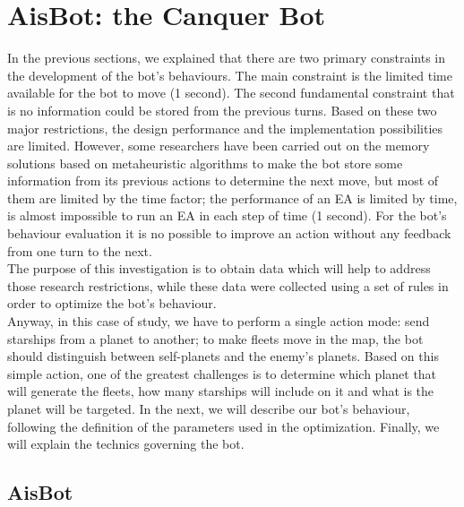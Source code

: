 \documentclass[conference]{IEEEtran}
\begin{document}
\section{AisBot: the Canquer Bot}
In the previous sections, we explained that there are two primary constraints in the development of the bot's behaviours. The main constraint is the limited time available for the bot to move (1 second). The second fundamental constraint that is no information could be stored from the previous turns. Based on these two major restrictions, the design performance and the implementation possibilities are limited. However, some researchers have been carried out on the memory solutions based on metaheuristic algorithms to make the bot store some information from its previous actions to determine the next move, but most of them are limited by the time factor; the performance of an EA is limited by time, is almost impossible to run an EA in each step of time (1 second). For the bot's behaviour evaluation it is no possible to improve an action without any feedback from one turn to the next. \\
The purpose of this investigation is to obtain data which will help to address those research restrictions, while these data were collected using a set of rules in order to optimize the bot's behaviour. \\
Anyway, in this case of study, we have to perform a single action mode: send starships from a planet to another; to make fleets move in the map, the bot should distinguish between self-planets and the enemy's planets. Based on this simple action, one of the greatest challenges is to determine which planet that will generate the fleets, how many starships will include on it and what is the planet will be targeted. In the next, we will describe our bot's behaviour, following the definition of the parameters used in the optimization. Finally, we will explain the technics governing the bot.




\subsection{AisBot}


\end{document}
